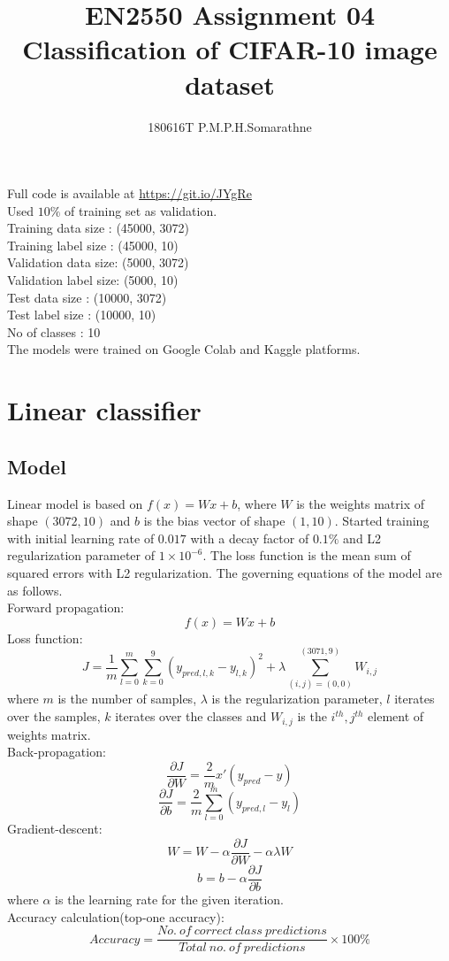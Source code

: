 \documentclass[10pt, a4paper, twocolumn]{article}
\title{{\Large \textbf{EN2550 Assignment 04\\
{\LARGE Classification of CIFAR-10 image dataset}}}}
\author{{\large 180616T P.M.P.H.Somarathne}}
\date{\tiny}
\begin{document}
\maketitle
Full code is available at \url{https://git.io/JYgRe}\\
Used $10\%$ of training set as validation.\\
Training data size : (45000, 3072)\\
Training label size : (45000, 10)\\
Validation data size: (5000, 3072) \\
Validation label size: (5000, 10)\\
Test data size : (10000, 3072)\\
Test label size : (10000, 10)\\
No of classes : 10\\
The models were trained on Google Colab and Kaggle platforms.

\section{Linear classifier}
\subsection{Model}
Linear model is based on $f(x) = Wx + b$, where $W$ is the weights matrix of shape $(3072,10)$ and $b$ is the bias vector of shape $(1,10)$. Started training with initial learning rate of $0.017$ with a decay factor of $0.1\%$ and L2 regularization parameter of $1 \times 10^{-6}$. The loss function is the mean sum of squared errors with L2 regularization. The governing equations of the model are as follows.\\
Forward propagation: {\small \[f(x) = Wx + b\]}
Loss function: {\small \[J = \frac{1}{m}\sum_{l=0}^{m}\sum_{k=0}^{9}(y_{pred,l,k}-y_{l,k})^{2} + \lambda\sum_{(i,j) = (0,0)}^{(3071,9)} W_{i,j}\]} where $m$ is the number of samples, $\lambda$ is the regularization parameter, $l$ iterates over the samples, $k$ iterates over the classes and $W_{i,j}$ is the $i^{th},j^{th}$ element of weights matrix.\\
Back-propagation:{\small 
\[\frac{\partial J}{\partial W} = \frac{2}{m}x'(y_{pred}-y)\]
\[\frac{\partial J}{\partial b} = \frac{2}{m}\sum_{l=0}^{m}(y_{pred,l}-y_{l})\]}
Gradient-descent:{\small 
\[W = W - \alpha \frac{\partial J}{\partial W} - \alpha \lambda W\]
\[b = b - \alpha \frac{\partial J}{\partial b}\]} where $\alpha$ is the learning rate for the given iteration.\\
Accuracy calculation(top-one accuracy):{\small 
\[Accuracy = \frac{No.\ of\ correct\ class\ predictions}{Total\ no.\ of\ predictions}\times 100\%\]}
\end{document}
